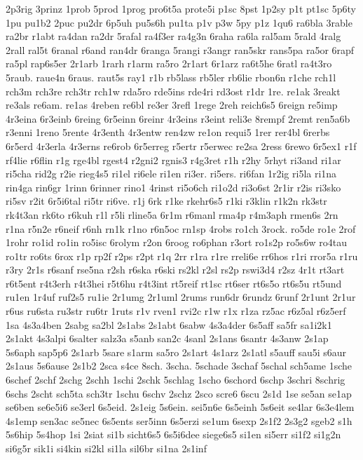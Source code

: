 {2p3rig
3prinz
1prob
5prod
1prog
pro6t5a
prote5i
p1sc
8pst
1p2sy
p1t
pt1sc
5p6ty
1pu
pu1b2
2puc
pu2dr
6p5uh
pu5s6h
pu1ta
p1v
p3w
5py
p1z
1qu6
ra6bla
3rable
ra2br
r1abt
ra4dan
ra2dr
5rafal
ra4f3er
ra4g3n
6raha
ra6la
ral5am
5rald
4ralg
2rall
ral5t
6ranal
r6and
ran4dr
6ranga
5rangi
r3angr
ran5skr
rans5pa
ra5or
6rapf
ra5pl
rap6s5er
2r1arb
1rarh
r1arm
ra5ro
2r1art
6r1arz
ra6t5he
6ratl
ra4t3ro
5raub.
raue4n
6raus.
raut5s
ray1
r1b
rb5lass
rb5ler
rb6lie
rbon6n
r1che
rch1l
rch3m
rch3re
rch3tr
rch1w
rda5ro
rde5ins
rde4ri
rd3ost
r1dr
1re.
re1ak
3reakt
re3als
re6am.
re1as
4reben
re6bl
re3er
3refl
1rege
2reh
reich6s5
6reign
re5imp
4r3eina
6r3einb
6reing
6r5einn
6reinr
4r3eins
r3eint
reli3e
8rempf
2remt
ren5a6b
r3enni
1reno
5rente
4r3enth
4r3entw
ren4zw
re1on
requi5
1rer
rer4bl
6rerbs
6r5erd
4r3erla
4r3erns
re6rob
6r5erreg
r5ertr
r5erwec
re2sa
2ress
6rewo
6r5ex1
r1f
rf4lie
r6flin
r1g
rge4bl
rgest4
r2gni2
rgnis3
r4g3ret
r1h
r2hy
5rhyt
ri3and
ri1ar
ri5cha
rid2g
r2ie
rieg4s5
ri1el
ri6ele
ri1en
ri3er.
ri5ers.
ri6fan
1r2ig
ri5la
ri1na
rin4ga
rin6gr
1rinn
6rinner
rino1
4rinst
ri5o6ch
ri1o2d
ri3o6st
2r1ir
r2is
ri3sko
ri5sv
r2it
6r5i6tal
ri5tr
ri6ve.
r1j
6rk
r1ke
rkehr6s5
r1ki
r3klin
r1k2n
rk3str
rk4t3an
rk6to
r6kuh
r1l
r5li
rline5a
6r1m
r6manl
rma4p
r4m3aph
rmen6s
2rn
r1na
r5n2e
r6neif
r6nh
rn1k
r1no
r6n5oc
rn1sp
4robs
ro1ch
3rock.
ro5de
ro1e
2rof
1rohr
ro1id
ro1in
ro5isc
6rolym
r2on
6roog
ro6phan
r3ort
ro1s2p
ro5s6w
ro4tau
ro1tr
ro6ts
6rox
r1p
rp2f
r2ps
r2pt
r1q
2rr
r1ra
r1re
rreli6e
rr6hos
r1ri
rror5a
r1ru
r3ry
2r1s
r6sanf
rse5na
r2sh
r6ska
r6ski
rs2kl
r2sl
rs2p
rswi3d4
r2sz
4r1t
rt3art
r6t5ent
r4t3erh
r4t3hei
r5t6hu
r4t3int
rt5reif
rt1sc
rt6ser
rt6s5o
rt6s5u
rt5und
ru1en
1r4uf
ruf2s5
ru1ie
2r1umg
2r1uml
2rums
run6dr
6rundz
6runf
2r1unt
2r1ur
r6us
ru6sta
ru3str
ru6tr
1ruts
r1v
rven1
rvi2c
r1w
r1x
r1za
rz5ac
r6z5al
r6z5erf
1sa
4s3a4ben
2sabg
sa2bl
2s1abs
2s1abt
6sabw
4s3a4der
6s5aff
sa5fr
sa1i2k1
2s1akt
4s3alpi
6salter
salz3a
s5anb
san2c
4sanl
2s1ans
6santr
4s3anw
2s1ap
5s6aph
sap5p6
2s1arb
5sare
s1arm
sa5ro
2s1art
4s1arz
2s1atl
s5auff
sau5i
s6aur
2s1aus
5s6ause
2s1b2
2sca
s4ce
8sch.
3scha.
5schade
3schaf
5schal
sch5ame
1sche
6schef
2schf
2schg
2schh
1schi
2schk
5schlag
1scho
6schord
6schp
3schri
8schrig
6schs
2scht
sch5ta
sch3tr
1schu
6schv
2schz
2sco
scre6
6scu
2s1d
1se
se5an
se1ap
se6ben
se6e5i6
se3erl
6s5eid.
2s1eig
5s6ein.
sei5n6e
6s5einh
5s6eit
se4lar
6s3e4lem
4s1emp
sen3ac
se5nec
6s5ents
ser5inn
6s5erzi
se1um
6sexp
2s1f2
2s3g2
sgeb2
s1h
5s6hip
5s4hop
1si
2siat
si1b
sicht6s5
6s5i6dee
siege6s5
si1en
si5err
si1f2
si1g2n
si6g5r
sik1i
si4kin
si2kl
si1la
sil6br
si1na
2s1inf
}
